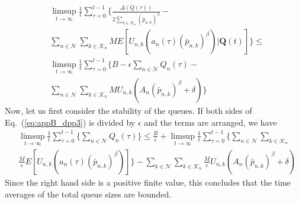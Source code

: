 \documentclass[conference]{IEEEtran}
\newcommand{\Kset}{\mathcal{K}}
\newcommand{\Nset}{\mathcal{N}}
\begin{document}
\begin{align} \label{eq:appB_dpp3}
& \limsup_{t \rightarrow \infty}  \frac{1}{t} \sum_{\tau = 0}^{t-1} \biggl \{ \frac{\Delta(Q(\tau))}{2 \sum_{k \in \Kset_{n}} (\bar{p}_{n,k})^{\beta} }  - \nonumber \\
& \sum_{n \in \Nset} \sum_{k \in \Kset_{n}} M E[U_{n,k} (a_{n}(\tau) (\bar{p}_{n,k})^{\beta}) | \boldsymbol Q(t) ]   \biggr \} \leq  \nonumber \\
& \limsup_{t \rightarrow \infty}  \frac{1}{t} \sum_{\tau = 0}^{t-1}  \biggl \{ B - \epsilon \sum_{n \in \Nset} Q_{n}(\tau) - \nonumber \\
& \sum_{n \in \Nset} \sum_{k \in \Kset_{n}} M U_{n,k} (A_n(\bar{p}_{n,k})^{\beta} + \delta)  \biggr \}
\end{align} Now, let us first consider the stability of the queues. If both sides of Eq.~(\ref{eq:appB_dpp3}) is divided by $\epsilon$ and the terms are arranged, we have
\begin{align}
& \limsup_{t \rightarrow \infty}  \frac{1}{t} \sum_{\tau = 0}^{t-1} \bigl \{ \sum_{n \in \Nset} Q_{n}(\tau) \bigr \} \leq \frac{B}{\epsilon} + \limsup_{t \rightarrow \infty}  \frac{1}{t} \sum_{\tau = 0}^{t-1} \bigl \{ \sum_{n \in \Nset} \sum_{k \in \Kset_{n}} \nonumber \\
& \frac{M}{\epsilon} E[U_{n,k}(a_{n}(\tau) (\bar{p}_{n,k})^{\beta} )] \bigr \} - \sum_{k \in \Nset} \sum_{k \in \Kset_{n}} \frac{M}{\epsilon} U_{n,k} (A_n(\bar{p}_{n,k})^{\beta} + \delta)
\end{align} Since the right hand side is a positive finite value, this concludes that the time averages of the total queue sizes are bounded. 
\end{document}
